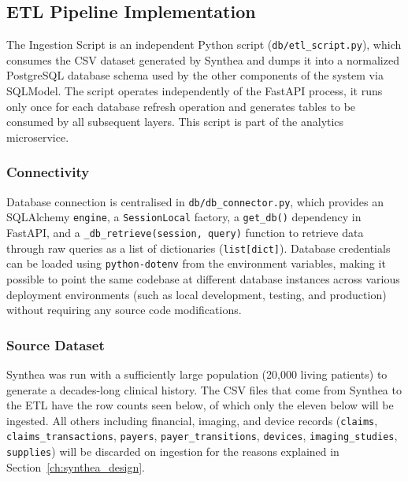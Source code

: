 \subsection{ETL Pipeline Implementation}

The Ingestion Script is an independent Python script (\texttt{db/etl\_script.py}), which consumes the CSV dataset generated by Synthea and dumps it into a normalized PostgreSQL database schema used by the other components of the system via SQLModel. The script operates independently of the FastAPI process, it runs only once for each database refresh operation and generates tables to be consumed by all subsequent layers. This script is part of the analytics microservice.

\subsubsection*{Connectivity}

Database connection is centralised in \texttt{db/db\_connector.py}, which provides an SQLAlchemy \texttt{engine}, a \texttt{SessionLocal} factory, a \texttt{get\_db()} dependency in FastAPI, and a \texttt{\_db\_retrieve(session, query)} function to retrieve data through raw queries as a list of dictionaries (\texttt{list[dict]}). Database credentials can be loaded using \texttt{python-dotenv} from the environment variables, making it possible to point the same codebase at different database instances across various deployment environments (such as local development, testing, and production) without requiring any source code modifications.

\subsubsection*{Source Dataset}

Synthea was run with a sufficiently large population (20{,}000 living patients) to generate a decades-long clinical history. The CSV files that come from Synthea to the ETL have the row counts seen below, of which only the eleven below will be ingested. All others including financial, imaging, and device records (\texttt{claims}, \texttt{claims\_transactions}, \texttt{payers}, \texttt{payer\_transitions}, \texttt{devices}, \texttt{imaging\_studies}, \texttt{supplies}) will be discarded on ingestion for the reasons explained in Section~\ref{ch:synthea_design}.

